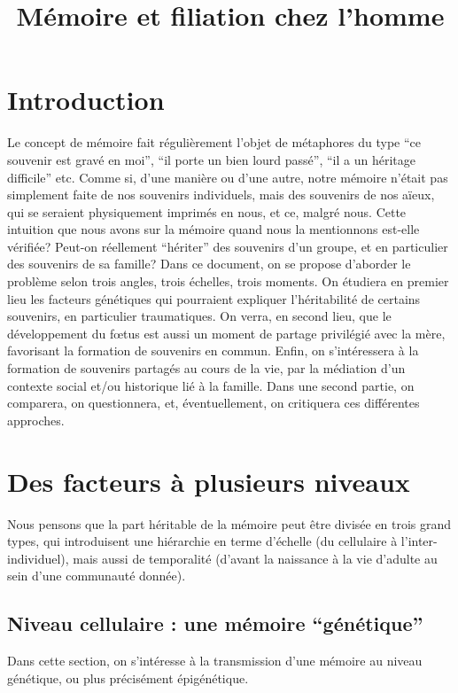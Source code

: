 \documentclass[french]{article}
\title{Mémoire et filiation chez l'homme}
\begin{document}
	\maketitle
	\section*{Introduction}
		Le concept de mémoire fait régulièrement l'objet de métaphores du type ``ce souvenir est gravé en moi'', ``il porte un bien lourd passé'', ``il a un héritage difficile'' etc. Comme si, d'une manière ou d'une autre, notre mémoire n'était pas simplement faite de nos souvenirs individuels, mais des souvenirs de nos aïeux, qui se seraient physiquement imprimés en nous, et ce, malgré nous. Cette intuition que nous avons sur la mémoire quand nous la mentionnons est-elle vérifiée? Peut-on réellement ``hériter'' des souvenirs d'un groupe, et en particulier des souvenirs de sa famille? Dans ce document, on se propose d'aborder le problème selon trois angles, trois échelles, trois moments. On étudiera en premier lieu les facteurs génétiques qui pourraient expliquer l'héritabilité de certains souvenirs, en particulier traumatiques. On verra, en second lieu, que le développement du fœtus est aussi un moment de partage privilégié avec la mère, favorisant la formation de souvenirs en commun. Enfin, on s'intéressera à la formation de souvenirs partagés au cours de la vie, par la médiation d'un contexte social et/ou historique lié à la famille. Dans une second partie, on comparera, on questionnera, et, éventuellement, on critiquera ces différentes approches.
	\section{Des facteurs à plusieurs niveaux}
		Nous pensons que la part héritable de la mémoire peut être divisée en trois grand types, qui introduisent une hiérarchie en terme d'échelle (du cellulaire à l'inter-individuel), mais aussi de temporalité (d'avant la naissance à la vie d'adulte au sein d'une communauté donnée). 
		\subsection{Niveau cellulaire : une mémoire ``génétique''}
			Dans cette section, on s'intéresse à la transmission d'une mémoire au niveau génétique, ou plus précisément épigénétique.
\end{document}
